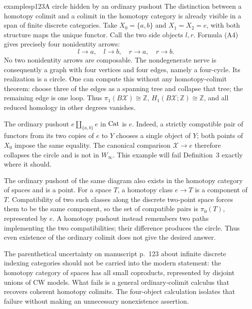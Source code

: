 \begin{dcomment}{examples}{p123}{A circle hidden by an ordinary pushout}
The distinction between a homotopy colimit and a colimit in the homotopy category is already visible in a span of finite discrete categories.  Take $X_0=\{a,b\}$ and $X_1=X_2=e$, with both structure maps the unique functor.  Call the two side objects $l,r$.  Formula (A4) gives precisely four nonidentity arrows:
\[
 l\to a,\quad l\to b,\quad r\to a,\quad r\to b.
\]
No two nonidentity arrows are composable.  The nondegenerate nerve is consequently a graph with four vertices and four edges, namely a four-cycle.  Its realization is a circle.  One can compute this without any homotopy-colimit theorem: choose three of the edges as a spanning tree and collapse that tree; the remaining edge is one loop.  Thus $\pi_1(B\mathcal X)\cong\mathbb Z$, $H_1(B\mathcal X;\mathbb Z)\cong\mathbb Z$, and all reduced homology in other degrees vanishes.

The ordinary pushout $e\amalg_{\{a,b\}}e$ in $\mathrm{Cat}$ is $e$.  Indeed, a strictly compatible pair of functors from its two copies of $e$ to $Y$ chooses a single object of $Y$; both points of $X_0$ impose the same equality.  The canonical comparison $\mathcal X\to e$ therefore collapses the circle and is not in $W_\infty$.  This example will fail Definition~3 exactly where it should.

The ordinary pushout of the same diagram also exists in the homotopy category of spaces and is a point.  For a space $T$, a homotopy class $e\to T$ is a component of $T$.  Compatibility of two such classes along the discrete two-point space forces them to be the same component, so the set of compatible pairs is $\pi_0(T)$, represented by $e$.  A homotopy pushout instead remembers two paths implementing the two compatibilities; their difference produces the circle.  Thus even existence of the ordinary colimit does not give the desired answer.

The parenthetical uncertainty on manuscript p.~123 about infinite discrete indexing categories should not be carried into the modern statement: the homotopy category of spaces has all small coproducts, represented by disjoint unions of CW models.  What fails is a general ordinary-colimit calculus that recovers coherent homotopy colimits.  The four-object calculation isolates that failure without making an unnecessary nonexistence assertion.
\end{dcomment}


